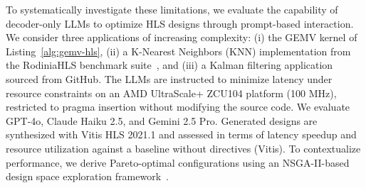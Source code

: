 To systematically investigate these limitations, we evaluate the capability of decoder-only LLMs to optimize HLS designs through prompt-based interaction. 
We consider three applications of increasing complexity: (i) the GEMV kernel of Listing~\ref{alg:gemv-hls}, (ii) a K-Nearest Neighbors (KNN) implementation from the RodiniaHLS benchmark suite~\cite{cong2018understanding}, and (iii) a Kalman filtering application sourced from GitHub.
The LLMs are instructed to minimize latency under resource constraints on an AMD UltraScale+ ZCU104 platform (100 MHz), restricted to pragma insertion without modifying the source code.
We evaluate GPT-4o, Claude Haiku 2.5, and Gemini 2.5 Pro. Generated designs are synthesized with Vitis HLS 2021.1 and assessed in terms of latency speedup and resource utilization against a baseline without directives (Vitis). To contextualize performance, we derive Pareto-optimal configurations using an NSGA-II-based design space exploration framework~\cite{ferikoglou2026gnomegasis}.

